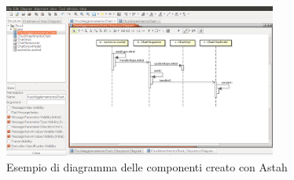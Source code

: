 				\begin{figure}[H]
					\centering
					\includegraphics[width=0.8\textwidth]{NormeDiProgetto/Pics/SequenzaAstah.png}
					\caption{Esempio di diagramma delle componenti creato con Astah}
				\end{figure}

